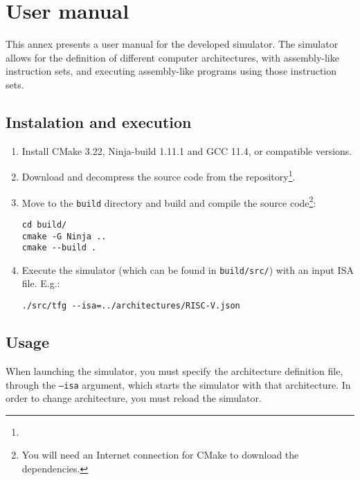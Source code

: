\chapter{User manual}\label{app:manual}
This annex presents a user manual for the developed simulator. The simulator allows for the definition of different computer architectures, with assembly-like instruction sets, and executing assembly-like programs using those instruction sets.


\section*{Instalation and execution}
\begin{enumerate}
  \item Install CMake 3.22, Ninja-build 1.11.1 and GCC 11.4, or compatible versions.
  \item Download and decompress the source code from the repository\footnote{\myrepo}.
  \item Move to the \texttt{build} directory and build and compile the source code\footnote{You will need an Internet connection for CMake to download the dependencies.}:
  \begin{tcolorbox}[bottom=-8pt]
    \begin{verbatim}
cd build/
cmake -G Ninja ..
cmake --build .
    \end{verbatim}
  \end{tcolorbox}
  \item Execute the simulator (which can be found in \texttt{build/src/}) with an input \gls{ISA} file. E.g.:
  \begin{tcolorbox}[bottom=-8pt]
    \begin{verbatim}
./src/tfg --isa=../architectures/RISC-V.json
    \end{verbatim}
  \end{tcolorbox}
\end{enumerate}


\section*{Usage}
When launching the simulator, you must specify the architecture definition file, through the \texttt{--isa} argument, which starts the simulator with that architecture. In order to change architecture, you must reload the simulator.

